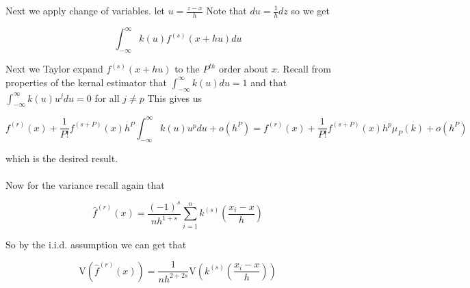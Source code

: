 \documentclass[11pt]{article}
\newcommand{\V}{\mathrm{V}}
\begin{document}
Next we apply change of variables. let $u = \frac{z - x}{h}$ Note that $du=\frac{1}{h}dz$ so we get 

$$ \int_{-\infty}^{\infty}  k(u)f^{(s)}(x+hu)du $$

Next we Taylor expand $f^{(s)}(x+hu)$ to the $P^{th}$ order about $x$. Recall from properties of the kernal estimator that $ \int_{-\infty}^{\infty}k(u)du = 1$ and that $ \int_{-\infty}^{\infty}k(u)u^jdu = 0$ for all $j\neq p$ This gives us

$$ f^{(r)}(x) +\frac{1}{P!}f^{(s+P)}(x)h^P\int_{-\infty}^{\infty}k(u)u^pdu +o(h^P)
= f^{(r)}(x) +\frac{1}{P!}f^{(s+P)}(x)h^p \mu_P(k) +o(h^P)
$$

which is the desired result. 
\\ \\ 

Now for the variance recall again that 

$$ \hat{f}^{(r)}(x) = \frac{(-1)^s}{nh^{1+s}} \sum_{i=1}^{n}k^{(s)} \left( \frac{{x}_i - x}{h} \right) 
$$

So by the i.i.d. assumption we can get that 

$$ \V \left(\hat{f}^{(r)}(x) \right) = \frac{1}{nh^{2+2s}} \V \left( k^{(s)} \left( \frac{{x}_i - x}{h} \right)  \right)
$$

\end{document}
